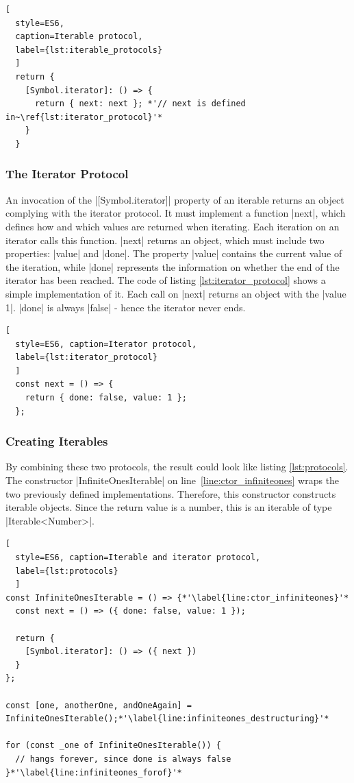 \begin{lstlisting}[
  style=ES6, 
  caption=Iterable protocol,
  label={lst:iterable_protocols}
  ]
  return {
    [Symbol.iterator]: () => {
      return { next: next }; *'// next is defined in~\ref{lst:iterator_protocol}'*
    }
  }
\end{lstlisting}

\subsubsection{The Iterator Protocol}
\label{subsub:The Iterator Protocol}
An invocation of the |[Symbol.iterator]| property of an iterable returns an
object complying with the iterator protocol. It must implement a function
|next|, which defines how and which values are returned when iterating. Each
iteration on an iterator calls this function. |next| returns an object, which
must include two properties: |value| and |done|. The property |value| contains
the current value of the iteration, while |done| represents the information on
whether the end of the iterator has been reached. The code of listing
\ref{lst:iterator_protocol} shows a simple implementation of it. Each call on
|next| returns an object with the |value 1|. |done| is always |false| - hence
the iterator never ends. 

\begin{lstlisting}[
  style=ES6, caption=Iterator protocol,
  label={lst:iterator_protocol}
  ]
  const next = () => {
    return { done: false, value: 1 };
  };
\end{lstlisting}

\subsubsection{Creating Iterables}
\label{subsub:Creating Iterables}
By combining these two protocols, the result could look like listing
\ref{lst:protocols}. The constructor |InfiniteOnesIterable| on
line~\ref{line:ctor_infiniteones} wraps the two
previously defined implementations. Therefore, this constructor constructs
iterable objects. Since the return value is a number, this is an
iterable of type |Iterable<Number>|.

\begin{lstlisting}[
  style=ES6, caption=Iterable and iterator protocol,
  label={lst:protocols}
  ]
const InfiniteOnesIterable = () => {*'\label{line:ctor_infiniteones}'*
  const next = () => ({ done: false, value: 1 });

  return {
    [Symbol.iterator]: () => ({ next })
  }
};

const [one, anotherOne, andOneAgain] = InfiniteOnesIterable();*'\label{line:infiniteones_destructuring}'*

for (const _one of InfiniteOnesIterable()) { 
  // hangs forever, since done is always false
}*'\label{line:infiniteones_forof}'*
\end{lstlisting}

